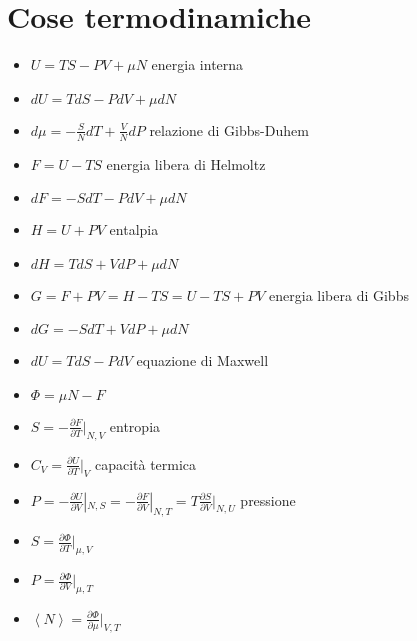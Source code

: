\documentclass[a4paper]{article}
\begin{document}
    \section{Cose termodinamiche}
        \begin{itemize}
            \item $U=TS-PV+\mu N$ energia interna
            \item $dU=TdS-PdV+\mu dN$
            \item $d\mu=-\frac{S}{N}dT+\frac{V}{N}dP$ relazione di Gibbs-Duhem
            \item $F=U-TS$ energia libera di Helmoltz
            \item $dF=-SdT-PdV+\mu dN$
            \item $H=U+PV$ entalpia
            \item $dH=TdS+VdP+\mu dN$
            \item $G=F+PV=H-TS=U-TS+PV$ energia libera di Gibbs
            \item $dG=-SdT+VdP+\mu dN$
            \item $dU=TdS-PdV$ equazione di Maxwell
            \item $\Phi=\mu N-F$
            \item $S=-\frac{\partial F}{\partial T}|_{N,V}$ entropia
            \item $C_V=\frac{\partial U}{\partial T}|_{V}$ capacità termica
            \item $P=-\frac{\partial U}{\partial V}|_{N,S}=-\frac{\partial F}{\partial V}|_{N,T}=T\frac{\partial S}{\partial V}|_{N,U}$ pressione
            \item $S=\frac{\partial\Phi}{\partial T}|_{\mu, V}$
            \item $P=\frac{\partial\Phi}{\partial V}|_{\mu,T}$
            \item $\left\langle N \right\rangle=\frac{\partial\Phi}{\partial\mu}|_{V,T}$
        \end{itemize}
\end{document}
